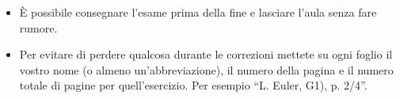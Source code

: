 \documentclass[12pt,a4paper]{article}
\begin{document}
\begin{itemize}
\item È possibile consegnare l'esame prima della fine e lasciare l'aula senza fare rumore.


\item Per evitare di perdere qualcosa durante le correzioni mettete su ogni foglio il vostro nome (o almeno un'abbreviazione), il numero della pagina e il numero totale di pagine per quell'esercizio. Per esempio ``L. Euler, G1), p. 2/4''.



\end{itemize}
\end{document}
